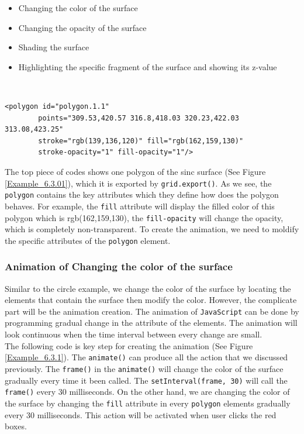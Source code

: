 \documentclass[11pt]{report}
\begin{document}
\begin{itemize}
	\item Changing the color of the surface
	\item Changing the opacity of the surface
	\item Shading the surface
	\item Highlighting the specific fragment of the surface and showing its z-value  
\end{itemize}
\\

\begin{lstlisting}
<polygon id="polygon.1.1" 
        points="309.53,420.57 316.8,418.03 320.23,422.03 313.08,423.25" 
        stroke="rgb(139,136,120)" fill="rgb(162,159,130)" 
        stroke-opacity="1" fill-opacity="1"/>
\end{lstlisting}
The top piece of codes shows one polygon of the sinc surface (See Figure \ref{Example_6.3.01}), which it is exported by \texttt{grid.export()}. As we see, the \texttt{polygon} contains the key attributes which they define how does the polygon behaves. For example, the \texttt{fill} attribute will display the filled color of this polygon which is rgb(162,159,130), the \texttt{fill-opacity} will change the opacity, which is completely non-transparent.
To create the animation, we need to moldify the specific attributes of the \texttt{polygon} element. 
 
\newpage
\subsubsection*{Animation of Changing the color of the surface}
Similar to the circle example, we change the color of the surface by locating the elements that contain the surface then modify the color. However, the complicate part will be the animation creation. The animation of \texttt{JavaScript} can be done by programming gradual change in the attribute of the elements. The animation will look continuous when the time interval between every change are small.\\

The following code is key step for creating the animation (See Figure \ref{Example_6.3.1}). The \texttt{animate()} can produce all the action that we discussed previously. The \texttt{frame()} in the \texttt{animate()} will change the color of the surface gradually every time it been called.  The \texttt{setInterval(frame, 30)} will call the \texttt{frame()} every 30 milliseconds. On the other hand, we are changing the color of the surface by changing the \texttt{fill} attribute in every \texttt{polygon} elements gradually every 30 milliseconds. This action will be activated when user clicks the red boxes.
\end{document}

